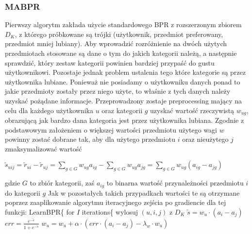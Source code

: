 \documentclass{pracamgr}
\begin{document}
    \subsubsection{MABPR}
     Pierwszy algorytm zakłada użycie standardowego BPR z rozszerzonym zbiorem $D_K$, z którego próbkowane są trójki
     (użytkownik, przedmiot preferowany, przedmiot mniej lubiany).
     Aby wprowadzić rozróżnienie na dwóch użytych przedmiotach stosowane są dane o tym do jakich kategorii należą,
     a następnie sprawdzić, który zestaw kategorii powinien bardziej przypaść do gustu użytkownikowi.
     Pozostaje jednak problem ustalenia tego które kategorie są przez użytkownika lubiane.
     Ponieważ nie posiadamy o użytkowniku danych ponad to jakie przedmioty zostały przez niego użyte, to właśnie z tych danych należy uzyskać
     pożądane informacje.
     Przeprowadzony zostaje preprocessing mający na celu dla każdego użytkownika $u$ oraz kategorii $g$ uzyskać
     wartość rzeczywistą $w_{ug}$, obrazującą jak bardzo dana kategoria jest przez użytkownika lubiana.
     Zgodnie z podstawowym założeniem o większej wartości przedmiotu użytego wagi $w$ powinny zostać dobrane tak,
     aby dla użytego przedmiotu $i$ oraz nieużytego $j$ zmaksymalizować wartość
     \begin{center}
      $\tilde{s}_{uij}=\tilde{r}_{ui}-\tilde{r}_{uj}=\sum_{g\in G}w_{ug}a_{ig}-\sum_{g\in G}w_{ug}a_{jg}=\sum_{g\in G}w_{ug}(a_{ig}-a_{jg})$
     \end{center}
     {\scriptsize
      gdzie $G$ to zbiór kategorii, zaś $a_{ig}$ to binarna wartość przynależności przedmiotu $i$ do kategorii $g$
     }\newline
     Jak w pozostałych takich przypadkach wartości te są otrzymane poprzez zaaplikowanie algorytmu iteracyjnego zejścia po gradiencie dla tej funkcji:\newline
     \hspace*{0pt} LearnBPR\{\newline
     \hspace*{16pt}	for $I$ iterations\{\newline
     \hspace*{32pt}		wylosuj $(u,i,j)$ z $D_K$\newline 
     \hspace*{32pt}		$\tilde{s}=w_u\cdot(a_i-a_j)$\newline
     \hspace*{32pt}		$err=\frac{e^{-\tilde{s}}}{1+e^{-\tilde{s}}}$\newline
     \hspace*{32pt}		$w_u=w_u+\alpha\cdot(err\cdot (a_i-a_j)-\lambda_w\cdot w_u)$\newline
\end{document}
